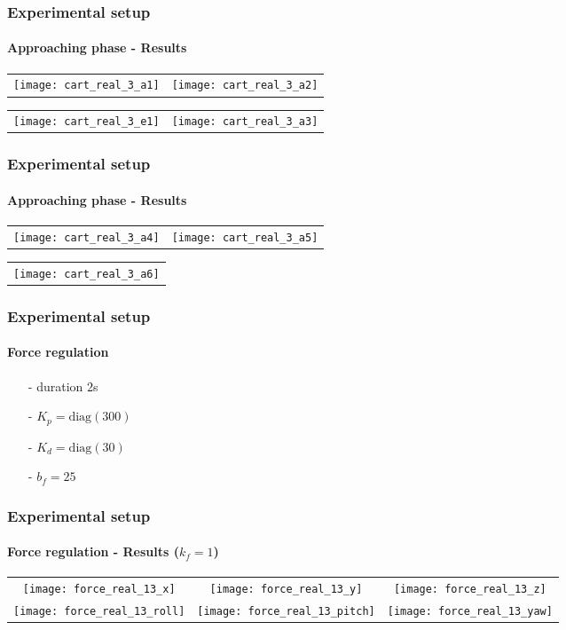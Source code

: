 \begin{frame}
  \frametitle{Experimental setup}
  \framesubtitle{Approaching phase - Results}
  \begin{center}
   \vskip-0.1in
    \begin{tabular}{cc}
      \texttt{[image: cart\_real\_3\_a1]} &
      \texttt{[image: cart\_real\_3\_a2]}
    \end{tabular}
  \end{center}
  \begin{center}
   \vskip-0.1in
    \begin{tabular}{cc}
      \texttt{[image: cart\_real\_3\_e1]} &
      \texttt{[image: cart\_real\_3\_a3]}
    \end{tabular}
  \end{center}
\end{frame}

\begin{frame}
  \frametitle{Experimental setup}
  \framesubtitle{Approaching phase - Results}
  \begin{center}
   \vskip-0.1in
    \begin{tabular}{cc}
      \texttt{[image: cart\_real\_3\_a4]} &
      \texttt{[image: cart\_real\_3\_a5]}
    \end{tabular}
  \end{center}
  \begin{center}
   \vskip-0.1in
    \begin{tabular}{c}
      \texttt{[image: cart\_real\_3\_a6]}
    \end{tabular}
  \end{center}
\end{frame}

\begin{frame}
  \frametitle{Experimental setup}
  \framesubtitle{Force regulation}
  \begin{itemize}
  \item[-] duration $2$s
  \item[-] $K_p = \mathrm{diag}(300)$
  \item[-] $K_d = \mathrm{diag}(30)$
  \item[-] $b_f = 25$
  \end{itemize}
\end{frame}

\begin{frame}
  \frametitle{Experimental setup}
  \framesubtitle{Force regulation - Results ($k_{f} = 1$)}
  \begin{center}
   \vskip-0.1in
    \begin{tabular}{ccc}
      \texttt{[image: force\_real\_13\_x]} &
      \texttt{[image: force\_real\_13\_y]} &
      \texttt{[image: force\_real\_13\_z]} \\
      \texttt{[image: force\_real\_13\_roll]} &
      \texttt{[image: force\_real\_13\_pitch]} &
      \texttt{[image: force\_real\_13\_yaw]}
    \end{tabular}
  \end{center}
\end{frame}

